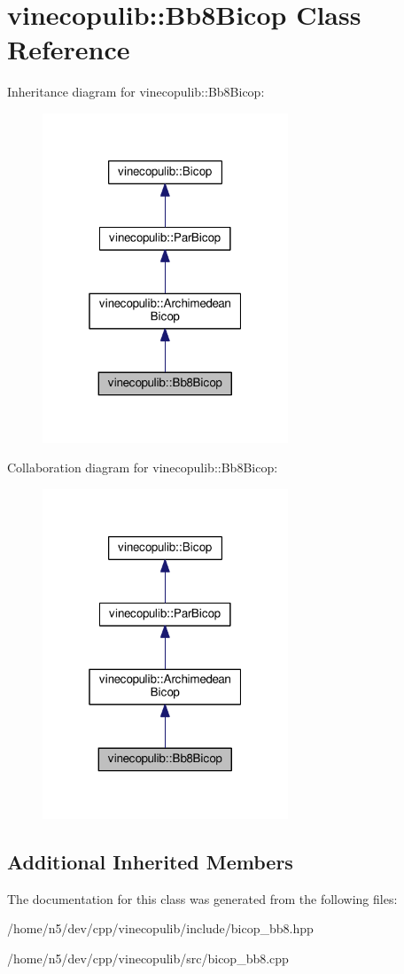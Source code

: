 \hypertarget{classvinecopulib_1_1_bb8_bicop}{}\section{vinecopulib\+:\+:Bb8\+Bicop Class Reference}
\label{classvinecopulib_1_1_bb8_bicop}


Inheritance diagram for vinecopulib\+:\+:Bb8\+Bicop\+:\nopagebreak
\begin{figure}[H]
\begin{center}
\leavevmode
\includegraphics[width=208pt]{classvinecopulib_1_1_bb8_bicop__inherit__graph}
\end{center}
\end{figure}


Collaboration diagram for vinecopulib\+:\+:Bb8\+Bicop\+:\nopagebreak
\begin{figure}[H]
\begin{center}
\leavevmode
\includegraphics[width=208pt]{classvinecopulib_1_1_bb8_bicop__coll__graph}
\end{center}
\end{figure}
\subsection*{Additional Inherited Members}


The documentation for this class was generated from the following files\+:\begin{DoxyCompactItemize}
\item 
/home/n5/dev/cpp/vinecopulib/include/bicop\+\_\+bb8.\+hpp\item 
/home/n5/dev/cpp/vinecopulib/src/bicop\+\_\+bb8.\+cpp\end{DoxyCompactItemize}

